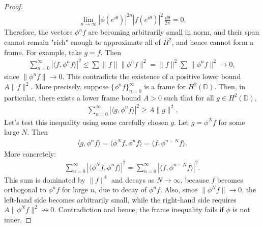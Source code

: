 \documentclass[10pt,a4paper]{amsart}
\begin{document}
\begin{proof}
\begin{eqnarray*}
\lim_{n\rightarrow\infty}|\phi(e^{i\theta})|^{2n}
|f(e^{i\theta})|^2 \, \frac{d\theta}{2\pi}=0.
\end{eqnarray*}
Therefore, the vectors $\phi^n f$ are becoming arbitrarily small
in norm, and their span cannot remain "rich" enough to approximate
all of $H^2$, and hence cannot form a frame. For example, take $g
= f$. Then
\begin{eqnarray*}
\sum_{n=0}^\infty |\langle f, \phi^n f \rangle|^2 \leq \sum \|f\|
\|\phi^n f\|^2 = \|f\|^2 \sum \|\phi^n f\|^2 \to 0,
\end{eqnarray*}
since $\|\phi^n f\| \to 0$. This contradicts the existence of a
positive lower bound $A \|f\|^2$. More precisely, suppose
$\{\phi^n f\}_{n=0}^\infty$ is a frame for $H^2(\mathbb{D})$.
Then, in particular, there exists a lower frame bound $A>0$ such
that for all $g \in H^2(\mathbb{D})$,
\begin{eqnarray*}
\sum_{n=0}^\infty |\langle g, \phi^n f \rangle|^2 \geq A \|g\|^2.
\end{eqnarray*}
Let's test this inequality using some carefully chosen $g$. Let $g
= \phi^N f$ for some large $N$. Then
\begin{eqnarray*} \langle g, \phi^n f \rangle = \langle \phi^N f,
\phi^n f \rangle = \langle f, \phi^{n - N} f \rangle.
\end{eqnarray*}
 More concretely:
\begin{eqnarray*}
\sum_{n=0}^\infty |\langle \phi^N f, \phi^n f \rangle|^2 =
\sum_{n=0}^\infty |\langle f, \phi^{n - N} f \rangle|^2.
\end{eqnarray*}
This sum is dominated by $\|f\|^4$ and decays as $N \to \infty$,
because $f$ becomes orthogonal to $\phi^n f$ for large $n$, due to
decay of $\phi^n f$. Also, since $\|\phi^N f\| \to 0$, the
left-hand side becomes arbitrarily small, while the right-hand
side requires $A \|\phi^N f\|^2 \not\to 0$. Contradiction and
hence, the frame inequality fails if $\phi$ is not inner.
\end{proof}
\end{document}
